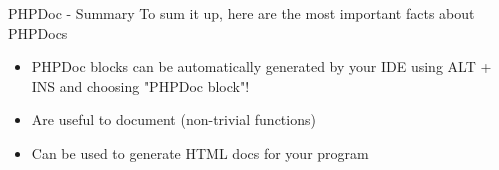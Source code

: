 \begin{frame}[fragile]{PHPDoc - Summary}	
	To sum it up, here are the most important facts about PHPDocs\pause
	\begin{itemize}
	\item PHPDoc blocks can be automatically generated by your IDE using ALT + INS and choosing "PHPDoc block"!\pause
	\item Are useful to document (non-trivial functions) \pause
	\item Can be used to generate HTML docs for your program \pause
	\end{itemize}
\end{frame}	



